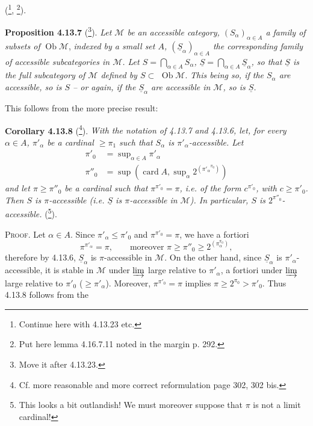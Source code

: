 \documentclass[11pt]{article}
\newcommand{\printedpage}[1]{\marginpar{\footnotesize p.~#1}}
\newcommand{\msp}[1]{\marginpar{\footnotesize [#1]}}
\newcommand{\M}{\mathcal{M}}
\newcommand{\Ob}{\operatorname{Ob}}
\newcommand{\card}{\operatorname{card}}
\newcommand{\uS}{\underline{S}}
\begin{document}
(\footnote[119]{Continue here with 4.13.23 etc.}, \footnote[120]{Put here lemma 4.16.7.11 noted in the margin p. 292.}).

\printedpage{108}
\msp{page 291}
\textbf{Proposition 4.13.7} (\footnote[121]{Move it after 4.13.23.}). \textit{Let $\M$ be an accessible category, $(S_\alpha)_{\alpha\in A}$ a family of subsets of} $\Ob\M$, \textit{indexed by a small set $A$, $(\uS_\alpha)_{\alpha\in A}$ the corresponding family of accessible subcategories in $\M$. Let $S = \bigcap_{\alpha\in A} S_\alpha$, $\uS = \bigcap_{\alpha\in A} \uS_\alpha$, so that $\uS$ is the full subcategory of $\M$ defined by $S \subset$} $\Ob\M$. \textit{This being so, if the $S_\alpha$ are accessible, so is $S$ – or again, if the $\uS_\alpha$ are accessible in $\M$, so is $\uS$.}

This follows from the more precise result:

\textbf{Corollary 4.13.8} (\footnote[122]{Cf. more reasonable and more correct reformulation page 302, 302 bis.}). \textit{With the notation of 4.13.7 and 4.13.6, let, for every $\alpha \in A$, $\pi'_\alpha$ be a cardinal $\geqslant \pi_1$ such that $S_\alpha$ is $\pi'_\alpha$-accessible. Let}
\[
\begin{aligned}
\pi'_0 &= \sup\nolimits_{\alpha\in A} \pi'_\alpha \\
\pi''_0 &= \sup(\card A, \sup\nolimits_\alpha 2^{({\pi'_\alpha}^{\pi_0})})
\end{aligned}
\]
\textit{and let $\pi \geqslant \pi''_0$ be a cardinal such that $\pi^{\pi'_0} = \pi$, i.e. of the form $c^{\pi'_0}$, with $c \geqslant \pi'_0$. Then $S$ is $\pi$-accessible (i.e. $\uS$ is $\pi$-accessible in $\M$). In particular, $S$ is $2^{\pi''_0}$-accessible.} (\footnote[123]{This looks a bit outlandish! We must moreover suppose that $\pi$ is not a limit cardinal!}).

\msp{page 292}
\textsc{Proof}. Let $\alpha \in A$. Since $\pi'_\alpha \leqslant \pi'_0$ and $\pi^{\pi'_0} = \pi$, we have a fortiori
\[
\pi^{\pi'_\alpha} = \pi , \qquad \text{moreover } \pi \geqslant \pi''_0 \geqslant 2^{(\pi_\alpha^{\pi_0})} , %
\]
therefore by 4.13.6, $\uS_\alpha$ is $\pi$-accessible in $\M$. On the other hand, since $\uS_\alpha$ is $\pi'_\alpha$-accessible, it is stable in $\M$ under $\varinjlim$ large relative to $\pi'_\alpha$, a fortiori under $\varinjlim$ large relative to $\pi'_0$ ($\geqslant \pi'_\alpha$). Moreover, $\pi^{\pi'_0} = \pi$ implies $\pi \geqslant 2^{\pi_0} > \pi'_0$. Thus 4.13.8 follows from the
\end{document}
